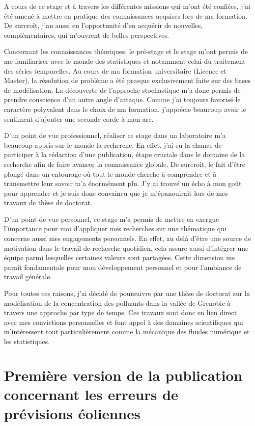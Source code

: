 \documentclass[12pt]{report}
\begin{document}
A cours de ce stage et à travers les différentes missions qui m'ont été confiées, j'ai été amené à mettre en pratique des connaissances acquises lors de ma formation. De surcroît, j'au aussi eu l'opportunité d'en acquérir de nouvelles, complémentaires, qui m'ouvrent de belles perspectives.

Concernant les connaissances théoriques, le pré-stage et le stage m'ont permis de me familiariser avec le monde des statistiques et notamment celui du traitement des séries temporelles. Au cours de ma formation universitaire (Licence et Master), la résolution de problème a été presque exclusivement faite sur des bases de modélisation. La découverte de l'approche stochastique m'a donc permis de prendre conscience d'un autre angle d'attaque. Comme j'ai toujours favorisé le caractère polyvalent dans le choix de ma formation, j'apprécie beaucoup avoir le sentiment d'ajouter une seconde corde à mon arc.

D'un point de vue professionnel, réaliser ce stage dans un laboratoire m'a beaucoup appris sur le monde la recherche. En effet, j'ai eu la chance de participer à la rédaction d'une publication, étape cruciale dans le domaine de la recherche afin de faire avancer la connaissance globale. De surcroît, le fait d'être plongé dans un entourage où tout le monde cherche à comprendre et à transmettre leur savoir m'a énormément plu.  J'y ai trouvé un écho à mon goût pour apprendre et je suis donc convaincu que je m'épanouirait lors de mes travaux de thèse de doctorat.

D'un point de vue personnel, ce stage m'a permis de mettre en exergue l'importance pour moi d'appliquer mes recherches sur une thématique qui concerne aussi mes engagements personnels. En effet, au delà d'être une source de motivation dans le travail de recherche quotidien, cela assure aussi d'intégrer une équipe parmi lesquelles certaines valeurs sont partagées. Cette dimension me paraît fondamentale pour mon développement personnel et pour l'ambiance de travail générale.

Pour toutes ces raisons, j'ai décidé de poursuivre par une thèse de doctorat sur la modélisation de la concentration des polluants dans la vallée de Grenoble à travers une approche par type de temps. Ces travaux sont donc en lien direct avec mes convictions personnelles et font appel à des domaines scientifiques qui m'intéressent tout particulièrement comme la mécanique des fluides numérique et les statistiques.


\appendix


\chapter{Première version de la publication concernant les erreurs de prévisions éoliennes}
\label{annex:ModelingWindPower}





\end{document}
